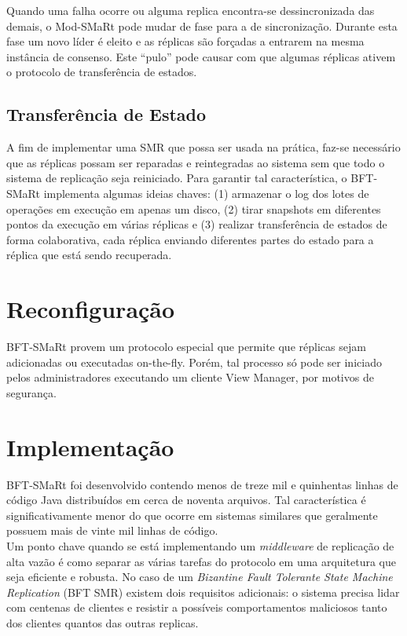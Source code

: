 		Quando uma falha ocorre ou alguma replica encontra-se dessincronizada das demais, o Mod-SMaRt pode mudar de fase para a de sincronização. Durante esta fase um novo líder é eleito e as réplicas são forçadas a entrarem na mesma instância de consenso. Este “pulo” pode causar com que algumas réplicas ativem o protocolo de transferência de estados.\\
		
		\subsection{Transferência de Estado}
		A fim de implementar uma SMR que possa ser usada na prática, faz-se necessário que as réplicas possam ser reparadas e reintegradas ao sistema sem que todo o sistema de replicação seja reiniciado. Para garantir tal característica, o BFT-SMaRt implementa algumas ideias chaves: (1) armazenar o log dos lotes de operações em execução em apenas um disco, (2) tirar snapshots em diferentes pontos da execução em várias réplicas e (3) realizar transferência de estados  de forma colaborativa, cada réplica enviando diferentes partes do estado para a réplica que está sendo recuperada.\\
	
	\section{Reconfiguração}
	BFT-SMaRt provem um protocolo especial que permite que réplicas sejam adicionadas ou executadas on-the-fly. Porém, tal processo só pode ser iniciado pelos administradores executando um cliente View Manager, por motivos de segurança.\\
	
	\section{Implementação}
	BFT-SMaRt foi desenvolvido contendo menos de treze mil e quinhentas linhas de código Java distribuídos em cerca de noventa arquivos. Tal característica é significativamente menor do que ocorre em sistemas similares que geralmente possuem mais de vinte mil linhas de código. \\
	
	Um ponto chave quando se está implementando um \textit{middleware} de replicação de alta vazão é como separar as várias tarefas do protocolo em uma arquitetura que seja eficiente e robusta. No caso de um \textit{Bizantine Fault Tolerante State Machine Replication} (BFT SMR) existem dois requisitos adicionais: o sistema precisa lidar com centenas de clientes e resistir a possíveis comportamentos maliciosos tanto dos clientes quantos das outras replicas.\\
	
